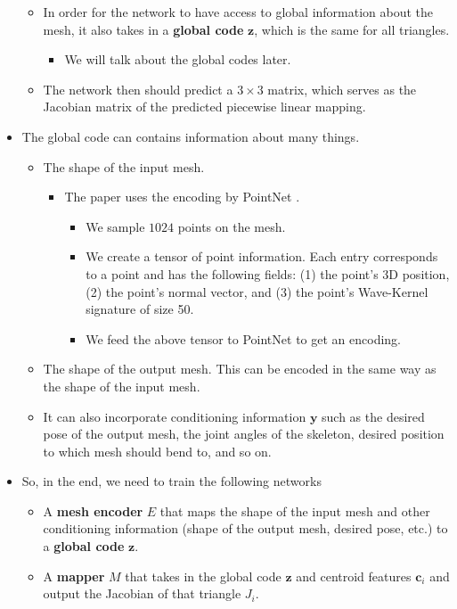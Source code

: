 \documentclass[10pt]{article}
\newcommand{\ve}[1]{\mathbf{#1}}
\begin{document}
\begin{itemize}
\begin{itemize}
        \item In order for the network to have access to global information about the mesh, it also takes in a {\bf global code} $\ve{z}$, which is the same for all triangles.
        \begin{itemize}
            \item We will talk about the global codes later.
        \end{itemize}

        \item The network then should predict a $3 \times 3$ matrix, which serves as the Jacobian matrix of the predicted piecewise linear mapping.
    \end{itemize}

    \item The global code can contains information about many things.
    \begin{itemize}        
        \item The shape of the input mesh.
        \begin{itemize}
            \item The paper uses the encoding by PointNet \cite{Qi:PointNet:2017}.
            \begin{itemize}
                \item We sample $1024$ points on the mesh.
                \item We create a tensor of point information. Each entry corresponds to a point and has the following fields: (1) the point's 3D position, (2) the point's normal vector, and (3) the point's Wave-Kernel signature \cite{Aubry:WKS:2011} of size 50.
                \item We feed the above tensor to PointNet to get an encoding.            
            \end{itemize}                    
        \end{itemize}

        \item The shape of the output mesh. This can be encoded in the same way as the shape of the input mesh.
        
        \item It can also incorporate conditioning information $\ve{y}$ such as the desired pose of the output mesh, the joint angles of the skeleton, desired position to which mesh should bend to, and so on.        
    \end{itemize}

    \item So, in the end, we need to train the following networks
    \begin{itemize}
        \item A {\bf mesh encoder} $E$ that maps the shape of the input mesh and other conditioning information (shape of the output mesh, desired pose, etc.) to a {\bf global code} $\ve{z}$.
        \item A {\bf mapper} $M$ that takes in the global code $\ve{z}$ and centroid features $\ve{c}_i$ and output the Jacobian of that triangle $J_i$.
    \end{itemize}


\end{itemize}
\end{document}

